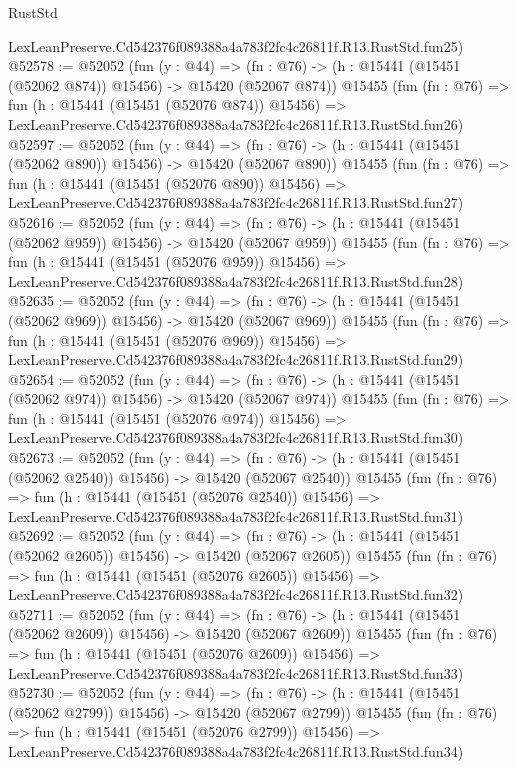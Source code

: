 \begin{lexlean}{RustStd}
\begin{coremodule}
    LexLeanPreserve.Cd542376f089388a4a783f2fc4c26811f.R13.RustStd.fun25)
@52578 := @52052
    (fun (y : @44) =>
    (fn : @76) -> (h : @15441 (@15451 (@52062 @874)) @15456) -> @15420 (@52067 @874))
    @15455
    (fun (fn : @76) =>
    fun (h : @15441 (@15451 (@52076 @874)) @15456) =>
    LexLeanPreserve.Cd542376f089388a4a783f2fc4c26811f.R13.RustStd.fun26)
@52597 := @52052
    (fun (y : @44) =>
    (fn : @76) -> (h : @15441 (@15451 (@52062 @890)) @15456) -> @15420 (@52067 @890))
    @15455
    (fun (fn : @76) =>
    fun (h : @15441 (@15451 (@52076 @890)) @15456) =>
    LexLeanPreserve.Cd542376f089388a4a783f2fc4c26811f.R13.RustStd.fun27)
@52616 := @52052
    (fun (y : @44) =>
    (fn : @76) -> (h : @15441 (@15451 (@52062 @959)) @15456) -> @15420 (@52067 @959))
    @15455
    (fun (fn : @76) =>
    fun (h : @15441 (@15451 (@52076 @959)) @15456) =>
    LexLeanPreserve.Cd542376f089388a4a783f2fc4c26811f.R13.RustStd.fun28)
@52635 := @52052
    (fun (y : @44) =>
    (fn : @76) -> (h : @15441 (@15451 (@52062 @969)) @15456) -> @15420 (@52067 @969))
    @15455
    (fun (fn : @76) =>
    fun (h : @15441 (@15451 (@52076 @969)) @15456) =>
    LexLeanPreserve.Cd542376f089388a4a783f2fc4c26811f.R13.RustStd.fun29)
@52654 := @52052
    (fun (y : @44) =>
    (fn : @76) -> (h : @15441 (@15451 (@52062 @974)) @15456) -> @15420 (@52067 @974))
    @15455
    (fun (fn : @76) =>
    fun (h : @15441 (@15451 (@52076 @974)) @15456) =>
    LexLeanPreserve.Cd542376f089388a4a783f2fc4c26811f.R13.RustStd.fun30)
@52673 := @52052
    (fun (y : @44) =>
    (fn : @76) -> (h : @15441 (@15451 (@52062 @2540)) @15456) -> @15420 (@52067 @2540))
    @15455
    (fun (fn : @76) =>
    fun (h : @15441 (@15451 (@52076 @2540)) @15456) =>
    LexLeanPreserve.Cd542376f089388a4a783f2fc4c26811f.R13.RustStd.fun31)
@52692 := @52052
    (fun (y : @44) =>
    (fn : @76) -> (h : @15441 (@15451 (@52062 @2605)) @15456) -> @15420 (@52067 @2605))
    @15455
    (fun (fn : @76) =>
    fun (h : @15441 (@15451 (@52076 @2605)) @15456) =>
    LexLeanPreserve.Cd542376f089388a4a783f2fc4c26811f.R13.RustStd.fun32)
@52711 := @52052
    (fun (y : @44) =>
    (fn : @76) -> (h : @15441 (@15451 (@52062 @2609)) @15456) -> @15420 (@52067 @2609))
    @15455
    (fun (fn : @76) =>
    fun (h : @15441 (@15451 (@52076 @2609)) @15456) =>
    LexLeanPreserve.Cd542376f089388a4a783f2fc4c26811f.R13.RustStd.fun33)
@52730 := @52052
    (fun (y : @44) =>
    (fn : @76) -> (h : @15441 (@15451 (@52062 @2799)) @15456) -> @15420 (@52067 @2799))
    @15455
    (fun (fn : @76) =>
    fun (h : @15441 (@15451 (@52076 @2799)) @15456) =>
    LexLeanPreserve.Cd542376f089388a4a783f2fc4c26811f.R13.RustStd.fun34)

\end{coremodule}
\end{lexlean}
